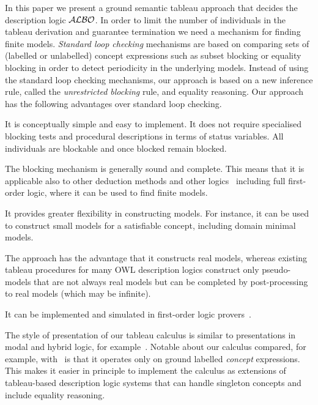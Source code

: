 \documentclass[leqno
,pdflatex
,prodmode
,acmtocl
]{acmsmall}
\newcommand{\mathcmd}[1]{\ensuremath{#1}\xspace}
\newcommand{\dlfont}{\mathcal}
\newcommand{\dl}[1]{\mathcmd{\dlfont{#1}}}
\newcommand{\ALBOid}{\dl{ALBO\smash[t]{\mbox{}}}}
\begin{document}
In this paper we present a ground semantic tableau approach that
decides the description logic \ALBOid.
In order to limit the number of individuals in the tableau derivation and guarantee
termination we need a
mechanism for finding finite models.
\emph{Standard loop checking} mechanisms are based on
comparing sets of (labelled or unlabelled)
concept expressions such as subset blocking or equality blocking
in order to detect periodicity in the underlying models.
Instead of using the standard loop checking mechanisms,
our approach is based on a new inference rule, called the \emph{unrestricted
blocking} rule, and equality reasoning. 
Our approach has the following advantages over standard loop checking.
\begin{longitem}
 \item It is conceptually simple and easy to implement.
 It does not require specialised blocking tests and 
procedural descriptions in terms of status variables.
All individuals are blockable and once blocked remain blocked.
 \item The blocking mechanism is generally sound and complete. 
    This means that it is applicable also to other deduction
    methods and other
    logics~\cite{SchmidtTishkovsky-GTM+-2008}
    including full first-order logic, where it can be used
    to find finite models. 
 \item It provides greater flexibility in constructing models.
       For instance, it can be used to construct small models for a satisfiable concept,
       including domain minimal models.
 \item
The approach has the advantage that it constructs
real models, whereas existing tableau procedures for many OWL 
description logics construct only pseudo-models that are not always
real models but can be completed by post-processing to real
models (which may be infinite).
\item
It can be implemented and simulated in first-order logic
provers~\cite{BaumgartnerSchmidt08}.
\end{longitem}

The style of presentation of our tableau calculus is similar to
presentations in modal and hybrid logic,
for example~\cite{Fitting-TMF+-1972,Blackburn-ILD-2000,DeNivelleSchmidtHustadt00,Schmidt06b,SchmidtOrlowskaHustadt04a,delCerroGasquet-GF+-2002}.
Notable about our calculus compared, for example,
with~\cite{Schmidt06b,SchmidtOrlowskaHustadt04a} is that it operates
only on ground labelled \emph{concept} expressions.
This makes it easier in principle to implement the calculus as extensions
of tableau-based description logic systems that can handle
singleton concepts and include equality reasoning.
\end{document}
